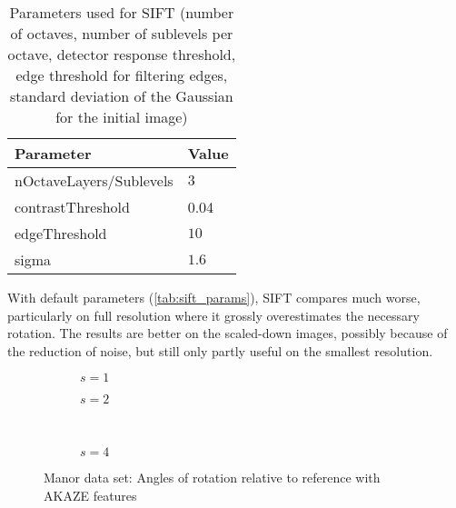 \begin{table}
   \begin{center}
      \begin{tabular}{>{\ttfamily}ll}
         \rowcolor{white}
         \toprule
         \rmfamily Parameter     & Value \\
         \midrule
         nOctaveLayers/Sublevels & $3$ \\
         contrastThreshold       & 0.04 \\
         edgeThreshold           & $10$ \\
         sigma                   & $1.6$ \\
         \bottomrule
      \end{tabular}
      \caption[Parameters used for SIFT]{Parameters used for SIFT (number of octaves, number of sublevels
      per octave, detector response threshold, edge threshold for filtering
   edges, standard deviation of the Gaussian for the initial image)}
      \label{tab:sift_params}
   \end{center}
\end{table}

With default parameters (\autoref{tab:sift_params}), SIFT compares much worse,
particularly on full resolution where it grossly overestimates the necessary
rotation. The results are better on the scaled-down images, possibly because of
the reduction of noise, but still only partly useful on the smallest resolution.

\begin{figure}
   \begin{subfigure}{.5\linewidth}
      \centering      
      
      \label{fig:manor_KAZE_rotation_1}
      \caption{$s=1$}
   \end{subfigure}
   \quad
   \begin{subfigure}{.5\linewidth}
      \centering      
      
      \label{fig:manor_KAZE_rotation_2}
      \caption{$s=2$}
   \end{subfigure}\\[3ex]
   \begin{subfigure}{\linewidth}
      \centering      
      
      \label{fig:manor_KAZE_rotation_4}
      \caption{$s=4$}
   \end{subfigure}
   \caption[Manor data: Rotation AKAZE]{Manor data set: Angles of rotation relative to reference with
   AKAZE features}
   \label{fig:manor_KAZE_rotation}
\end{figure}

